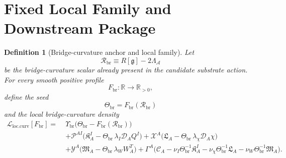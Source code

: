 \documentclass[11pt]{article}
\newcommand{\Sub}{\mathcal{A}}
\newcommand{\BridgeMetric}{\mathfrak g}
\newcommand{\SpatialD}{\mathcal D}
\newcommand{\ConstCurrent}{\mathcal C}
\newcommand{\ConstGamma}{\Gamma}
\newcommand{\CurvQMult}{\mathscr P}
\newcommand{\CurvChiMult}{\mathscr X}
\newcommand{\CurvTransMult}{\mathscr Y}
\newcommand{\CurvSeed}{\Theta_{\mathrm{br}}}
\newcommand{\CurvSeedMult}{\Upsilon_{\mathrm{br}}}
\newcommand{\CurvProfile}{F_{\mathrm{br}}}
\newcommand{\CurvOneI}{\mathfrak K}
\newcommand{\CurvOneChi}{\mathfrak L}
\newcommand{\CurvOneW}{\mathfrak M}
\newcommand{\BridgeCurv}{\mathcal R_{\mathrm{br}}}
\newtheorem{definition}{Definition}
\begin{document}
\section{Fixed Local Family and Downstream Package}

\begin{definition}[Bridge-curvature anchor and local family]
\label{def:family}
Let
\begin{equation}
\BridgeCurv \equiv R[\BridgeMetric]-2\Lambda_{\Sub}
\label{eq:anchor}
\end{equation}
be the bridge-curvature scalar already present in the candidate substrate action. For every smooth positive profile
\begin{equation}
\CurvProfile:\mathbb R\to\mathbb R_{>0},
\label{eq:positiveprofile}
\end{equation}
define the seed
\begin{equation}
\CurvSeed=\CurvProfile(\BridgeCurv)
\label{eq:seed}
\end{equation}
and the local bridge-curvature density
\begin{align}
\mathcal L_{\mathrm{loc.curv}}[\CurvProfile]
=\;&
\CurvSeedMult\bigl(\CurvSeed-\CurvProfile(\BridgeCurv)\bigr)
\nonumber\\
&+\CurvQMult^{AI}\bigl(\CurvOneI_A^I-\CurvSeed\,\lambda_I\SpatialD_AQ^I\bigr)
+\CurvChiMult^A\bigl(\CurvOneChi_A-\CurvSeed\,\lambda_\chi\SpatialD_A\chi\bigr)
\nonumber\\
&+\CurvTransMult^A\bigl(\CurvOneW_A-\CurvSeed\,\lambda_WW_A^T\bigr)
+\ConstGamma^A\bigl(
\ConstCurrent_A
-\nu_I\CurvSeed^{-1}\CurvOneI_A^I
-\nu_\chi\CurvSeed^{-1}\CurvOneChi_A
-\nu_W\CurvSeed^{-1}\CurvOneW_A
\bigr).
\label{eq:locfamily}
\end{align}
\end{definition}
\end{document}
